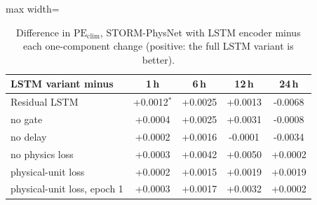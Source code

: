 \begin{table}[!t]
\centering
\caption{Difference in $\mathrm{PE}_\mathrm{clim}$, STORM-PhysNet with LSTM encoder minus each one-component change (positive: the full LSTM variant is better).}
\label{tab:paired_lstm}
\footnotesize
\setlength{\tabcolsep}{4pt}
\begin{adjustbox}{max width=\linewidth}
\begin{tabular}{lcccc}
\toprule
LSTM variant minus & 1\,h & 6\,h & 12\,h & 24\,h \\
\midrule
Residual LSTM & +0.0012$^{*}$ & +0.0025 & +0.0013 & -0.0068 \\
no gate & +0.0004 & +0.0025 & +0.0031 & -0.0008 \\
no delay & +0.0002 & +0.0016 & -0.0001 & -0.0034 \\
no physics loss & +0.0003 & +0.0042 & +0.0050 & +0.0002 \\
physical-unit loss & +0.0002 & +0.0015 & +0.0019 & +0.0019 \\
physical-unit loss, epoch 1 & +0.0003 & +0.0017 & +0.0032 & +0.0002 \\
\bottomrule
\end{tabular}
\end{adjustbox}

\par{}
\end{table}
